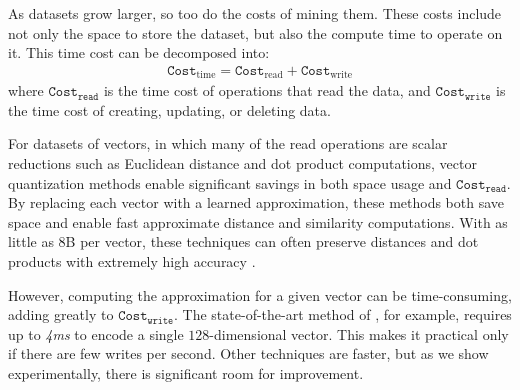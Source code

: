 


As datasets grow larger, so too do the costs of mining them. These costs include not only the space to store the dataset, but also the compute time to operate on it. This time cost can be decomposed into:
\begin{align}
    \texttt{Cost}_{\text{time}} = \texttt{Cost}_{\text{read}} + \texttt{Cost}_{\text{write}}
\end{align}
where $\texttt{Cost}_{\texttt{read}}$ is the time cost of operations that read the data, and $\texttt{Cost}_{\texttt{write}}$ is the time cost of creating, updating, or deleting data.

For datasets of vectors, in which many of the read operations are scalar reductions such as Euclidean distance and dot product computations, vector quantization methods enable significant savings in both space usage and $\texttt{Cost}_{\texttt{read}}$. By replacing each vector with a learned approximation, these methods both save space and enable fast approximate distance and similarity computations. With as little as 8B per vector, these techniques can often preserve distances and dot products with extremely high accuracy \cite{lsq,otq,opq,cq,stackedQuantizers}.







However, computing the approximation for a given vector can be time-consuming, adding greatly to $\texttt{Cost}_{\texttt{write}}$. The state-of-the-art method of \cite{lsq}, for example, requires up to \textit{4ms} to encode a single $128$-dimensional vector. This makes it practical only if there are few writes per second. Other techniques are faster, but as we show experimentally, there is significant room for improvement.

